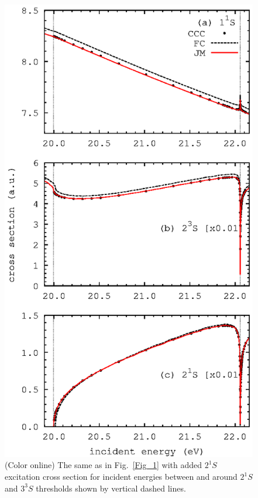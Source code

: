 \documentclass[aip
, pra
, showpacs
, aps
, twocolumn
, groupedaddress
, floatfix
]{revtex4}
\begin{document}
\begin{figure}[htb]
\includegraphics[scale=1]{fig1b.ps}
\caption{(Color online) The same as in Fig.~\ref{Fig_1} with added $2^1S$ excitation cross section
for incident energies between and around $2^1S$ and $3^3S$ thresholds shown by vertical dashed lines.
}
\label{Fig_1b}
\end{figure}
\end{document}
